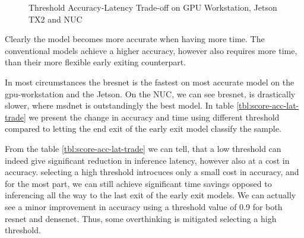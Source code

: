 \begin{figure}
	\hfill
	\caption[Threshold Accuracy-Latency Trade-off]{Threshold Accuracy-Latency Trade-off on \protect{} GPU Workstation, \protect{} Jetson TX2 and \protect{} NUC }
	\label{fig:threshold-acc-lat-trade-off-by-time}
\end{figure}

Clearly the model becomes more accurate when having more time. The conventional models achieve a higher accuracy, however also requires more time, than their more flexible early exiting counterpart.

In most circumstances the \gls{bresnet} is the fastest on most accurate model on the \gls{gpu}-workstation and the Jetson. On the NUC, we can see \gls{bresnet}, is drastically slower, where \gls{msdnet} is outstandingly the best model. In table \ref{tbl:score-acc-lat-trade} we present the change in accuracy and time using different threshold compared to letting the end exit of the early exit model classify the sample.

From the table \ref{tbl:score-acc-lat-trade} we can tell, that a low threshold can indeed give significant reduction in inference latency, however also at a cost in accuracy. selecting a high threshold introcuces only a small cost in accuracy, and for the most part, we can still achieve significant time savings opposed to inferencing all the way to the last exit of the early exit models. We can actually see a minor improvement in accuracy using a threshold value of 0.9 for both \gls{resnet} and \gls{densenet}. Thus, some overthinking is mitigated selecting a high threshold.



